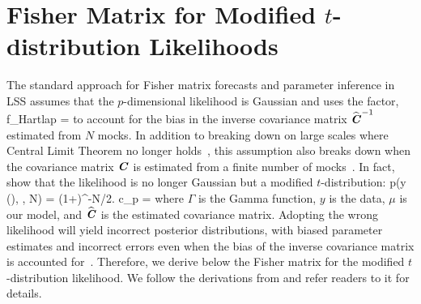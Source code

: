 \section{Fisher Matrix for Modified $t$-distribution Likelihoods} \label{sec:tdist}
The standard approach for Fisher matrix forecasts and parameter inference in LSS 
assumes that the $p$-dimensional likelihood is Gaussian and uses the \cite{hartlap2007} 
factor, 
\beq
f_{\rm Hartlap} = 
\eeq
to account for the bias in the inverse covariance matrix $\widehat{\textbf{\textit{C}}}^{-1}$ 
estimated from $N$ mocks. In addition to breaking down on large scales where Central 
Limit Theorem no longer holds~\citep{hahn2019}, this assumption also breaks down 
when the covariance matrix $\textbf{\textit{C}}$ is estimated from a finite number of 
mocks~\citep{sellentin2016}. In fact, \cite{sellentin2016} show that the likelihood 
is no longer Gaussian but a modified $t$-distribution: 
\beq \label{eq:tdist_like}
p(y \given \mu(\theta), , N) = 
 \left(1+\right)^{-N/2}.
\eeq
\beq
c_p = 
\eeq
where $\Gamma$ is the Gamma function, $y$ is the data, $\mu$ is our model, and 
$\widehat{\textbf{\textit{C}}}$ is the estimated covariance matrix. Adopting the wrong 
likelihood will yield incorrect posterior distributions, with biased parameter 
estimates and incorrect errors even when the bias of the inverse covariance matrix 
is accounted for~\citep{sellentin2016}. Therefore, we derive below the Fisher
matrix for the modified $t$-distribution likelihood. We follow the derivations 
from \cite{lange1989} and refer readers to it for details. 

